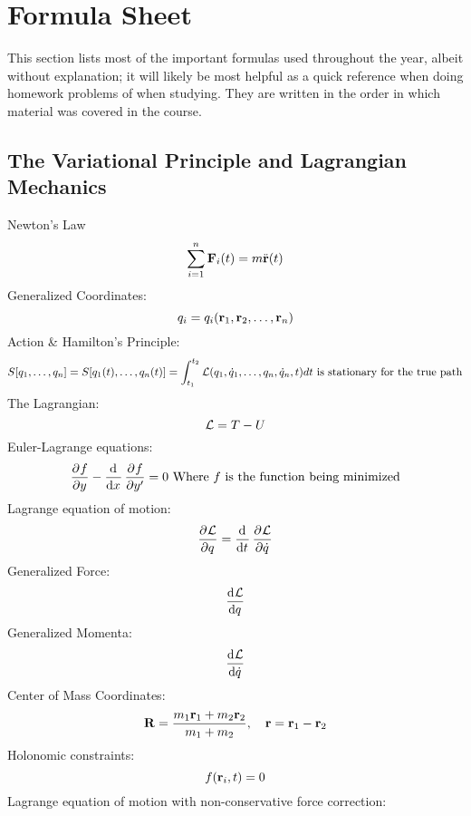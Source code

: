 \documentclass[../PHYS306Notes.tex]{subfiles}
\begin{document}
\section{Formula Sheet}
This section lists most of the important formulas used throughout the year, albeit without explanation; it will likely be most helpful as a quick reference when doing homework problems of when studying. They are written in the order in which material was covered in the course. 
\subsection{The Variational Principle and Lagrangian Mechanics}
Newton's Law
\begin{equation}
    \sum_{i=1}^{n}\mathbf{F}_i(t) = m\ddot{\mathbf{r}}(t)
\end{equation}
Generalized Coordinates:
\begin{equation}
q_i = q_i(\mathbf{r}_1, \mathbf{r}_2, \ldots, \mathbf{r}_n)
\end{equation}
Action \& Hamilton's Principle:
\begin{equation}
    S[q_1, \ldots, q_n] = S[q_1(t), \ldots, q_n(t)] = \int_{t_1}^{t_2}\mathcal{L}(q_1, \dot{q}_1,\ldots, q_n, \dot{q}_n, t)dt \text{ is stationary for the true path}
\end{equation}
The Lagrangian:
\begin{equation}
    \mathcal{L} = T - U
\end{equation}
Euler-Lagrange equations:
\begin{equation}
    \dpd{f}{y} - \dod{}{x}\dpd{f}{y'} = 0 \text{ Where $f$ is the function being minimized}
\end{equation}
Lagrange equation of motion:
\begin{equation}
    \dpd{\LL}{q} = \dod{}{t}\dpd{\LL}{\dot{q}}
\end{equation}
Generalized Force:
\begin{equation}
    \dod{\LL}{q}
\end{equation}
Generalized Momenta:
\begin{equation}
    \dod{\LL}{\dot{q}}
\end{equation}
Center of Mass Coordinates:
\begin{equation}
    \mathbf{R} = \frac{m_1\mathbf{r}_1 + m_2\mathbf{r}_2}{m_1 + m_2}, \quad \mathbf{r} = \mathbf{r}_1 - \mathbf{r}_2
\end{equation}
Holonomic constraints:
\begin{equation}
    f(\mathbf{r}_i, t) = 0
\end{equation}
Lagrange equation of motion with non-conservative force correction:
\end{document}
